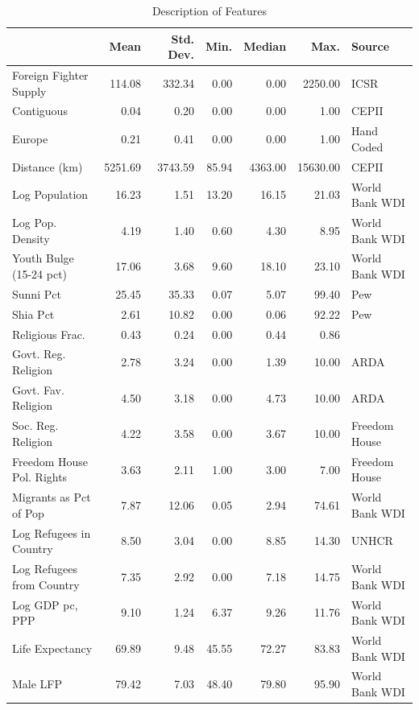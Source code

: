 \documentclass[12pt]{article}
\begin{document}
\begin{table}[!h]
	\footnotesize
	\centering
	\caption{Description of Features} 	\label{tab:data}
\begin{tabular}{lrrrrrl}
	\\ [-1.9ex] \toprule
	& Mean & Std. Dev. & Min. & Median & Max. & Source\\ 
	\midrule
	Foreign Fighter Supply & 114.08 & 332.34 & 0.00 & 0.00 & 2250.00 & ICSR \citep{Neumann2015}\\ 
	Contiguous & 0.04 & 0.20 & 0.00 & 0.00 & 1.00 & CEPII \\ 
	Europe & 0.21 & 0.41 & 0.00 & 0.00 & 1.00 & Hand Coded\\ 
	Distance (km) & 5251.69 & 3743.59 & 85.94 & 4363.00 & 15630.00 & CEPII \\ 
	Log Population & 16.23 & 1.51 & 13.20 & 16.15 & 21.03 & World Bank WDI \\ 
	Log Pop. Density & 4.19 & 1.40 & 0.60 & 4.30 & 8.95 & World Bank WDI\\ 
	Youth Bulge (15-24 pct) & 17.06 & 3.68 & 9.60 & 18.10 & 23.10 & World Bank WDI \\ 
	Sunni Pct & 25.45 & 35.33 & 0.07 & 5.07 & 99.40 & Pew \\ 
	Shia Pct & 2.61 & 10.82 & 0.00 & 0.06 & 92.22 & Pew \\ 
	Religious Frac. & 0.43 & 0.24 & 0.00 & 0.44 & 0.86 & \cite{Fearon2003} \\ 
	Govt. Reg. Religion & 2.78 & 3.24 & 0.00 & 1.39 & 10.00 & ARDA \\ 
	Govt. Fav. Religion & 4.50 & 3.18 & 0.00 & 4.73 &  10.00 & ARDA \\ 
	Soc. Reg. Religion & 4.22 & 3.58 & 0.00 & 3.67 & 10.00 & Freedom House \\ 
	Freedom House Pol. Rights & 3.63 & 2.11 & 1.00 & 3.00 & 7.00 & Freedom House  \\ 
	Migrants as Pct of Pop & 7.87 & 12.06 & 0.05 & 2.94 & 74.61 & World Bank WDI\\ 
	Log Refugees in Country & 8.50 & 3.04 & 0.00 & 8.85 & 14.30 & UNHCR \\ 
	Log Refugees from Country & 7.35 & 2.92 & 0.00 & 7.18 & 14.75 & World Bank WDI \\ 
	Log GDP pc, PPP & 9.10 & 1.24 & 6.37 & 9.26 & 11.76 & World Bank WDI \\ 
	Life Expectancy & 69.89 & 9.48 & 45.55 & 72.27 & 83.83 & World Bank WDI\\ 
	Male LFP & 79.42 & 7.03 & 48.40 & 79.80 & 95.90 & World Bank WDI \\ 

\end{tabular}
\end{table}
\end{document}
